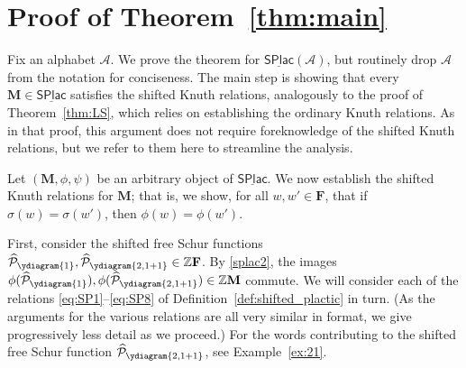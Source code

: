 \documentclass[12 pt]{amsart}
\newcommand{\Z}{\mathbb{Z}}
\newcommand{\Free}{\mathbf{F}}
\newcommand{\sPlactic}{\mathbf{S}}
\newcommand{\Monoid}{\mathbf{M}}
\newcommand{\Category}{\underline{\mathsf{SPlac}}}
\newcommand{\sFreeSchur}{\widehat{\mathcal{P}}}
\newcommand{\cA}{\mathcal{A}}
\theoremstyle{remark}
\numberwithin{equation}{section}
\begin{document}
   

\section{Proof of Theorem~\ref{thm:main}}\label{sec:shifted_universal_proof}
Fix an alphabet $\cA$. We prove the theorem for $\Category(\cA)$, but routinely drop $\cA$ from the notation for conciseness. The main step is showing that every $\Monoid \in \Category$ satisfies the shifted Knuth relations, analogously to the proof of Theorem~\ref{thm:LS}, which relies on establishing the ordinary Knuth relations. As in that proof, this argument does not require foreknowledge of the shifted Knuth relations, but we refer to them here to streamline the analysis.

    Let $(\Monoid, \phi, \psi)$ be an arbitrary object of $\Category$. We now establish the shifted Knuth relations for $\Monoid$; that is, we show, for all $w,w' \in \Free$, that if $\sigma(w) = \sigma(w')$, then $\phi(w) = \phi(w')$.
    
    First, consider the shifted free Schur functions $\sFreeSchur_{\ydiagram{1}}, \sFreeSchur_{\ydiagram{2,1+1}} \in \Z \Free$. By \ref{splac2}, the images $\phi(\sFreeSchur_{\ydiagram{1}}), \phi(\sFreeSchur_{\ydiagram{2,1+1}}) \in \Z \Monoid$ commute. 
        We will consider each of the relations \eqref{eq:SP1}--\eqref{eq:SP8} of Definition~\ref{def:shifted_plactic} in turn. (As the arguments for the various relations are all very similar in format, we give progressively less detail as we proceed.) For the words contributing to the shifted free Schur function $\sFreeSchur_{\ydiagram{2,1+1}}$, see Example~\ref{ex:21}.

    

    
\end{document}
